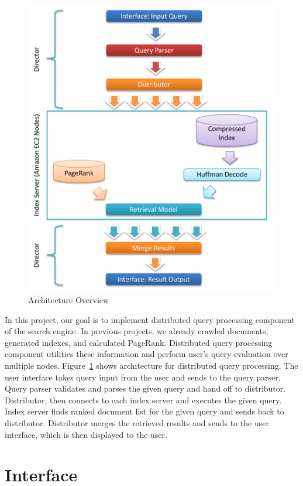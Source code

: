 \documentclass[letterpaper,11pt,twoside]{article}
\begin{document}
\begin{figure}[htbp]
 \centering
 \includegraphics[trim=0.0in 0.00in 0.0in 0.0in, clip, page=1]{Architecture.pdf}
 \caption{Architecture Overview}
 \label{fig:Architecture}
\end{figure}

In this project, our goal is to implement distributed query processing component of the search engine. In previous projects, we already crawled documents, generated indexes, and calculated PageRank. Distributed query processing component utilities these information and perform user's query evaluation over multiple nodes. Figure~\ref{fig:Architecture} shows  architecture for distributed query processing. The user interface takes query input from the user and sends to the query parser. Query parser validates and parses the given query and hand off to distributor. Distributor, then connects to each index server and executes the given query. Index server finds ranked document list for the given query and sends back to distributor. Distributor merges the retrieved results and sends to the user interface, which is then displayed to the user.  

\section{Interface}
\end{document}
